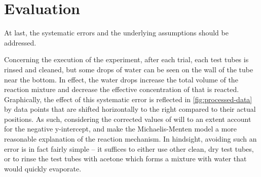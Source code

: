 \documentclass[a4paper, 12pt]{article}
\begin{document}
\section*{Evaluation}
At last, the systematic errors and the underlying assumptions should be addressed.

Concerning the execution of the experiment, after each trial, each test tubes is rinsed and cleaned, but some drops of water can be seen on the wall of the tube near the bottom. In effect, the water drops increase the total volume of the reaction mixture and decrease the effective concentration of  that is reacted. Graphically, the effect of this systematic error is reflected in \cref{fig:processed-data} by data points that are shifted horizontally to the right compared to their actual positions. As such, considering the corrected values of \ce{[H2O2]} will to an extent account for the negative y-intercept, and make the Michaelis-Menten model a more reasonable explanation of the reaction mechanism. In hindsight, avoiding such an error is in fact fairly simple -- it suffices to either use other clean, dry test tubes, or to rinse the test tubes with acetone which forms a mixture with water that would quickly evaporate.
\end{document}
